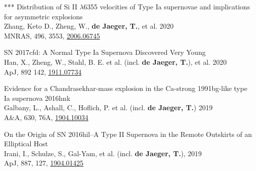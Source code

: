 \documentclass[12pt]{article}
\begin{document}
\begin{bibenum}
    \item 
*** Distribution of Si II $\lambda$6355 velocities of Type Ia supernovae and implications for asymmetric explosions \\
Zhang, Keto D., Zheng, W., \textbf{de Jaeger, T.}, et al. 2020\\
MNRAS, 496, 3553, \href{https://arxiv.org/abs/2006.06745}{2006.06745}
    \item 
SN 2017cfd: A Normal Type Ia Supernova Discovered Very Young\\
Han, X., Zheng, W., Stahl, B. E. et al. (incl. \textbf{de Jaeger, T.}), et al. 2020\\
ApJ, 892 142, \href{https://arxiv.org/abs/1911.07734}{1911.07734}
 \item 
Evidence for a Chandrasekhar-mass explosion in the Ca-strong 1991bg-like type Ia supernova 2016hnk\\
Galbany, L., Ashall, C., Hoflich, P. et al. (incl. \textbf{de Jaeger, T.}) 2019\\
A\&A, 630, 76A, \href{https://arxiv.org/abs/1904.10034}{1904.10034}
    \item 
On the Origin of SN 2016hil--A Type II Supernova in the Remote Outskirts of an Elliptical Host\\
Irani, I., Schulze, S., Gal-Yam, et al. (incl. \textbf{de Jaeger, T.}), 2019\\
ApJ, 887, 127, \href{https://arxiv.org/abs/1904.01425}{1904.01425}


\end{bibenum}
\end{document}
